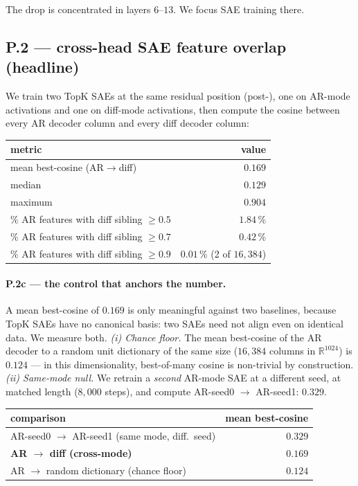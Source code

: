 The drop is concentrated in layers $6$--$13$. We focus SAE training
there.

\subsection{P.2 — cross-head SAE feature overlap (headline)}

We train two TopK SAEs at the same residual position (post-),
one on AR-mode activations and one on diff-mode activations, then
compute the cosine between every AR decoder column and every diff
decoder column:

\begin{center}
\begin{tabular}{lr}
\toprule
metric & value \\
\midrule
mean best-cosine (AR$\to$diff) & $0.169$ \\
median & $0.129$ \\
maximum & $0.904$ \\
\% AR features with diff sibling $\geq 0.5$ & $1.84$\,\% \\
\% AR features with diff sibling $\geq 0.7$ & $0.42$\,\% \\
\% AR features with diff sibling $\geq 0.9$ & $0.01$\,\% (2 of $16{,}384$) \\
\bottomrule
\end{tabular}
\end{center}

\paragraph{P.2c --- the control that anchors the number.}
A mean best-cosine of $0.169$ is only meaningful against two
baselines, because TopK SAEs have no canonical basis: two SAEs need
not align even on identical data. We measure both.
\emph{(i) Chance floor.} The mean best-cosine of the AR decoder to a
random unit dictionary of the same size ($16{,}384$ columns in
$\mathbb{R}^{1024}$) is $0.124$ --- in this dimensionality, best-of-many
cosine is non-trivial by construction.
\emph{(ii) Same-mode null.} We retrain a \emph{second} AR-mode SAE at
a different seed, at matched length ($8{,}000$ steps), and compute
AR-seed0 $\to$ AR-seed1: $0.329$.

\begin{center}
\begin{tabular}{lr}
\toprule
comparison & mean best-cosine \\
\midrule
AR-seed0 $\to$ AR-seed1 (same mode, diff.\ seed) & $0.329$ \\
\textbf{AR $\to$ diff (cross-mode)} & $\mathbf{0.169}$ \\
AR $\to$ random dictionary (chance floor) & $0.124$ \\
\bottomrule
\end{tabular}
\end{center}

